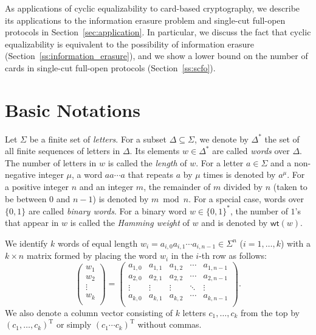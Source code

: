 \documentclass{article}
\theoremstyle{definition}
\newcommand{\bin}{\{0,1\}}
\newcommand{\wt}{\mathsf{wt}}
\begin{document}
As applications
of cyclic equalizability to card-based cryptography, we describe its applications to the information erasure problem and single-cut full-open protocols in Section~\ref{sec:application}. 
In particular, we discuss the fact that cyclic equalizability is equivalent to the possibility of information erasure (Section~\ref{ss:information_erasure}), and we show a lower bound on the number of cards in single-cut full-open protocols (Section~\ref{ss:scfo}). 

\section{Basic Notations}

Let $\Sigma$ be a finite set of \emph{letters}. 
For a subset $\Delta \subseteq \Sigma$, we denote by $\Delta^*$ the set of all finite sequences of letters in $\Delta$. 
Its elements $w \in \Delta^*$ are called \emph{words} over $\Delta$. 
The number of letters in $w$ is called the \emph{length} of $w$. 
For a letter $a \in \Sigma$ and a non-negative integer $\mu$, a word $aa\cdots a$ that repeats $a$ by $\mu$ times is denoted by $a^{\mu}$. 
For a positive integer $n$ and an integer $m$, the remainder of $m$ divided by $n$ (taken to be between $0$ and $n-1$) is denoted by $m \bmod n$.
For a special case, words over $\bin$ are called \emph{binary words}. 
For a binary word $w \in \{0,1\}^*$, the number of $1$'s that appear in $w$ is called the \emph{Hamming weight} of $w$ and is denoted by $\wt(w)$.

We identify $k$ words of equal length $w_i = a_{i,0} a_{i,1} \cdots a_{i,n-1} \in \Sigma^n$ ($i = 1,\dots,k$) with a $k \times n$ matrix formed by placing the word $w_i$ in the $i$-th row as follows:
\[
\begin{pmatrix}
w_1 \\
w_2 \\
\vdots \\
w_k \\
\end{pmatrix}
= 
\begin{pmatrix}
a_{1,0} & a_{1,1} & a_{1,2} & \cdots & a_{1,n-1} \\
a_{2,0} & a_{2,1} & a_{2,2} & \cdots & a_{2,n-1} \\
\vdots & \vdots & \vdots & \ddots & \vdots \\
a_{k,0} & a_{k,1} & a_{k,2} & \cdots & a_{k,n-1} \\
\end{pmatrix}.
\]
We also denote a column vector consisting of $k$ letters $c_1,\dots,c_k$ from the top by $(c_1,\dots,c_k)^{\mathrm{T}}$ or simply $(c_1 \cdots c_k)^{\mathrm{T}}$ without commas.
\end{document}
